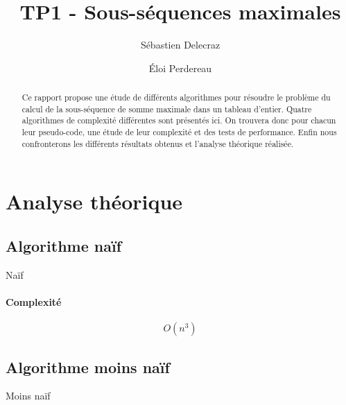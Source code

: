 \documentclass[11pt, a4paper]{article}
\title{TP1 - Sous-séquences maximales}
\author{Sébastien Delecraz \and \'Eloi Perdereau}
\begin{document}
\maketitle

\begin{abstract}
  Ce rapport propose une étude de différents algorithmes pour résoudre le
  problème du calcul de la sous-séquence de somme maximale dans un tableau
  d'entier. Quatre algorithmes de complexité différentes sont présentés ici.
  On trouvera donc pour chacun leur pseudo-code, une étude de leur
  complexité et des tests de performance. Enfin nous confronterons les
  différents résultats obtenus et l'analyse théorique réalisée.
\end{abstract}

\section{Analyse théorique}

\subsection{Algorithme naïf}

\begin{algorithm}
  \caption{Naïf}
\end{algorithm}
\paragraph{Complexité}
\[O(n^3)\]

\subsection{Algorithme moins naïf}

\begin{algorithm}
  \caption{Moins naïf}
\end{algorithm}
\end{document}
